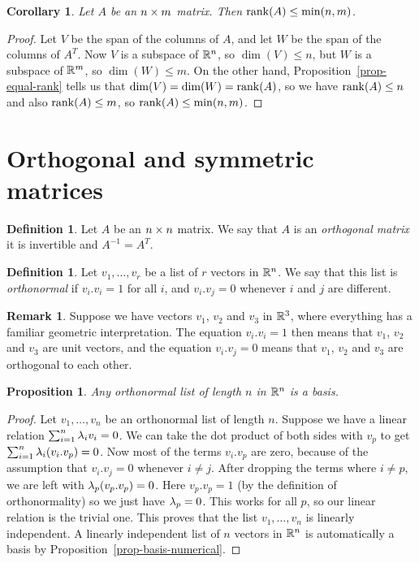 \documentclass[reqno]{amsart}
\newtheorem{proposition}[theorem]{Proposition}
\newtheorem{corollary}[theorem]{Corollary}
\theoremstyle{definition}
\newtheorem{remark}[theorem]{Remark}
\newtheorem{definition}[theorem]{Definition}
\newcommand{\dfn}[1]{\emph{{#1}}\index{#1}}
\begin{document}
\begin{corollary}\label{cor-max-rank}
 Let $A$ be an $n\times m$ matrix.  Then $\operatorname{rank}(A)\leq\min(n,m)$.
\end{corollary}
\begin{proof}
 Let $V$ be the span of the columns of $A$, and let $W$ be the span of
 the columns of $A^T$.  Now $V$ is a subspace of ${\mathbb{R}}^n$, so
 $\dim(V)\leq n$, but $W$ is a subspace of ${\mathbb{R}}^m$, so $\dim(W)\leq
 m$.  On the other hand, Proposition~\ref{prop-equal-rank} tells us
 that $\dim(V)=\dim(W)=\operatorname{rank}(A)$, so we have $\operatorname{rank}(A)\leq n$ and also
 $\operatorname{rank}(A)\leq m$, so $\operatorname{rank}(A)\leq\min(n,m)$.
\end{proof}

\section{Orthogonal and symmetric matrices}
\label{sec-symmetric}

\begin{definition}\label{defn-orthogonal}
 Let $A$ be an $n\times n$ matrix.  We say that $A$ is an
 \dfn{orthogonal matrix} it is invertible and $A^{-1}=A^T$.
\end{definition}

\begin{definition}\label{defn-orthonormal}
 Let $v_1,\dotsc,v_r$ be a list of $r$ vectors in ${\mathbb{R}}^n$.  We say that
 this list is \dfn{orthonormal} if $v_i.v_i=1$ for all $i$, and
 $v_i.v_j=0$ whenever $i$ and $j$ are different.
\end{definition}

\begin{remark}
 Suppose we have vectors $v_1$, $v_2$ and $v_3$ in ${\mathbb{R}}^3$, where
 everything has a familiar geometric interpretation.  The equation
 $v_i.v_i=1$ then means that $v_1$, $v_2$ and $v_3$ are unit vectors,
 and the equation $v_i.v_j=0$ means that $v_1$, $v_2$ and $v_3$ are
 orthogonal to each other.
\end{remark}

\begin{proposition}\label{prop-orthonormal-basis}
 Any orthonormal list of length $n$ in ${\mathbb{R}}^n$ is a basis.
\end{proposition}
\begin{proof}
 Let $v_1,\dotsc,v_n$ be an orthonormal list of length $n$.  Suppose
 we have a linear relation $\sum_{i=1}^n\lambda_iv_i=0$.  We can take the
 dot product of both sides with $v_p$ to get
 $\sum_{i=1}^n\lambda_i(v_i.v_p)=0$.  Now most of the terms $v_i.v_p$ are
 zero, because of the assumption that $v_i.v_j=0$ whenever $i\neq j$.
 After dropping the terms where $i\neq p$, we are left with
 $\lambda_p(v_p.v_p)=0$.  Here $v_p.v_p=1$ (by the definition of
 orthonormality) so we just have $\lambda_p=0$.  This works for all $p$,
 so our linear relation is the trivial one.  This proves that the list
 $v_1,\dotsc,v_n$ is linearly independent.  A linearly independent
 list of $n$ vectors in ${\mathbb{R}}^n$ is automatically a basis by
 Proposition~\ref{prop-basis-numerical}. 
\end{proof}
\end{document}
